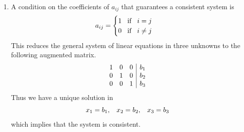 \documentclass[12pt]{amsart}
\begin{document}
\begin{enumerate}
\begin{enumerate}
		\end{enumerate}
		
	\item A condition on the coefficients of $a_{ij}$ that guarantees a consistent system is
		\begin{align}
			a_{ij}=
			\begin{cases}
				1 \hspace{0.3cm} \text{if} \hspace{0.3cm} i=j \notag \\
				0  \hspace{0.3cm} \text{if} \hspace{0.3cm} i\ne j \notag
			\end{cases}
		\end{align}
		This reduces the general system of linear equations in three unknowns to the following 
		augmented matrix.
			\begin{align}
				\begin{array}{ccc|c}
					1&0&0&b_1 \\
					0&1&0&b_2 \\
					0&0&1&b_3
				\end{array} \notag
			\end{align} 
		Thus we have a unique solution in 
		$$x_1=b_1, \hspace{0.3cm} x_2=b_2, \hspace{0.3cm} x_3=b_3$$
		which implies that the system is consistent.
				
\end{enumerate}
	
\end{document}
